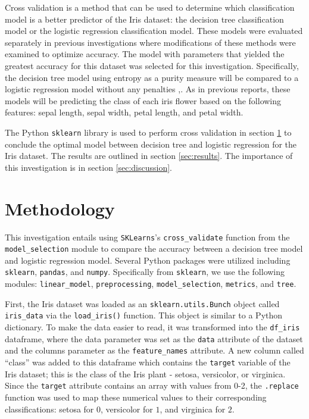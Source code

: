 \documentclass[journal]{IEEEtran}
\begin{document}
Cross validation is a method that can be used to determine which classification model is a better predictor of the Iris dataset: the decision tree classification model or the logistic regression classification model. These models were evaluated separately in previous investigations where modifications of these methods were examined to optimize accuracy. The model with parameters that yielded the greatest accuracy for this dataset was selected for this investigation. Specifically, the decision tree model using entropy as a purity measure will be compared to a logistic regression model without any penalties \cite{b2},\cite{b3}. As in previous reports, these models will be predicting the class of each iris flower based on the following features: sepal length, sepal width, petal length, and petal width.

The Python \lstinline{sklearn} library is used to perform cross validation in section \ref{sec:methodology} to conclude the optimal model between decision tree and logistic regression for the Iris dataset. The results are outlined in section \ref{sec:results}. The importance of this investigation is in section \ref{sec:discussion}. 

\vspace{40px}

\section{Methodology}
\label{sec:methodology}

This investigation entails using \lstinline{SKLearns}'s \lstinline{cross_validate} function from the \lstinline{model_selection} module to compare the accuracy between a decision tree model and logistic regression model. Several Python packages were utilized including \lstinline{sklearn}, \lstinline{pandas}, and \lstinline{numpy}. Specifically from \lstinline{sklearn}, we use the following modules: \lstinline{linear_model}, \lstinline{preprocessing}, \lstinline{model_selection}, \lstinline{metrics}, and \lstinline{tree}. 

First, the Iris dataset was loaded as an \lstinline{sklearn.utils.Bunch} object called \lstinline{iris_data} via the \lstinline{load_iris()} function. This object is similar to a Python dictionary. To make the data easier to read, it was transformed into the \lstinline{df_iris} dataframe, where the data parameter was set as the \lstinline{data} attribute of the dataset and the columns parameter as the \lstinline{feature_names} attribute. A new column called “class” was added to this dataframe which contains the \lstinline{target} variable of the Iris dataset; this is the class of the Iris plant - setosa, versicolor, or virginica. Since the \lstinline{target} attribute contains an array with values from 0-2, the \lstinline{.replace} function was used to map these numerical values to their corresponding classifications: setosa for \(0\), versicolor for \(1\), and virginica for \(2\). 
\end{document}
